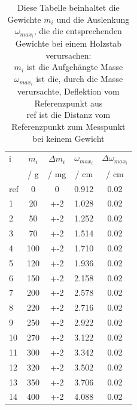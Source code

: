 \documentclass[11pt,ngerman]{scrartcl}
\begin{document}
\begin{table}[H]
    \centering
    \caption{
        Diese Tabelle beinhaltet die Gewichte $m_i$ und die Auslenkung $\omega_{max_{i}}$,
        die die entsprechenden Gewichte bei einem Holzstab verursachen:\\
        $m_{i}$ ist die Aufgehängte Masse \\
        $\omega_{max_{i}}$ ist die, durch die Masse verursachte, Deflektion vom Referenzpunkt aus \\
        ref ist die Distanz vom Referenzpunkt zum Messpunkt bei keinem Gewicht \\
    }
    \label{tab:messwerte_holz}
    \begin{tabular}{l|S|S|S|S}
        i   & {$m_i$}     & {$\Delta m_i$} & $\omega_{max_{i}}$ & $\Delta \omega_{max_{i}}$ \\
        {}  & {/ \si{\g}} & {/ \si{\mg}}    & {/ \si{\cm}}       & {/ \si{\cm}} \\ \hline \hline
        ref & 0   & 0   & 0.912 & 0.02\\
        1   & 20  & +-2 & 1.028 & 0.02\\
        2   & 50  & +-2 & 1.252 & 0.02\\
        3   & 70  & +-2 & 1.514 & 0.02\\
        4   & 100 & +-2 & 1.710 & 0.02\\
        5   & 120 & +-2 & 1.936 & 0.02\\
        6   & 150 & +-2 & 2.158 & 0.02\\
        7   & 200 & +-2 & 2.578 & 0.02\\
        8   & 220 & +-2 & 2.716 & 0.02\\
        9   & 250 & +-2 & 2.922 & 0.02\\
        10  & 270 & +-2 & 3.122 & 0.02\\
        11  & 300 & +-2 & 3.342 & 0.02\\
        12  & 320 & +-2 & 3.502 & 0.02\\
        13  & 350 & +-2 & 3.706 & 0.02\\
        14  & 400 & +-2 & 4.088 & 0.02\\
    \end{tabular}
\end{table}
\end{document}
